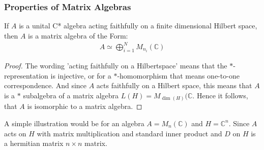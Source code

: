 \subsubsection{Properties of Matrix Algebras}
\begin{lemma}
    If $A$ is a unital C* algebra acting faithfully on a finite
    dimensional Hilbert space, then $A$ is a matrix algebra of the Form:
    \begin{align}
        A \simeq \bigoplus _{i=1}^N M_{n_i}(\mathbb{C})
    \end{align}
\end{lemma}
\begin{proof}
    The wording 'acting faithfully on a Hilbertspace' means that the
    $*$-representation is injective, or for a $*$-homomorphism that means
    one-to-one correspondence. And since $A$ acts faithfully on a Hilbert
    space, this means that $A$ is a $*$ subalgebra of a matrix algebra $L(H) = M_{\dim
    (H)}(\mathbb{C}$. Hence it follows, that $A$ is isomorphic to a matrix
    algebra.
\end{proof}

A simple illustration would be for an algebra $A = M_n(\mathbb{C})$ and
$H=\mathbb{C}^n$. Since $A$ acts on $H$ with matrix multiplication and standard
inner product and $D$ on $H$ is a hermitian matrix $n\times n$ matrix.

